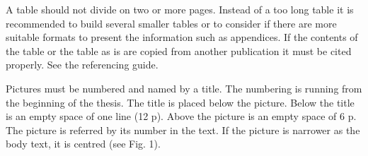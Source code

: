 \documentclass[a4paper,12pt]{article}
\begin{document}
\begin{table}[]
\caption{The heading style in the theses.}
\label{tab:table1}
\end{table}

A table should not divide on two or more pages. Instead of a too long table it is recommended to build several smaller tables or to consider if there are more suitable formats to present the information such as appendices. If the contents of the table or the table as is are copied from another publication it must be cited properly. See the referencing guide.

Pictures must be numbered and named by a title. The numbering is running from the beginning of the thesis. The title is placed below the picture. Below the title is an empty space of one line (12 p). Above the picture is an empty space of 6 p. The picture is referred by its number in the text. If the picture is narrower as the body text, it is centred (see Fig. 1). 
\end{document}
